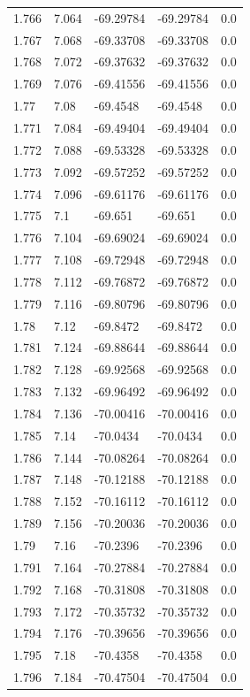 \begin{tabular}{lllll}
1.766 & 7.064 & -69.29784 & -69.29784 & 0.0 \\
1.767 & 7.068 & -69.33708 & -69.33708 & 0.0 \\
1.768 & 7.072 & -69.37632 & -69.37632 & 0.0 \\
1.769 & 7.076 & -69.41556 & -69.41556 & 0.0 \\
1.77 & 7.08 & -69.4548 & -69.4548 & 0.0 \\
1.771 & 7.084 & -69.49404 & -69.49404 & 0.0 \\
1.772 & 7.088 & -69.53328 & -69.53328 & 0.0 \\
1.773 & 7.092 & -69.57252 & -69.57252 & 0.0 \\
1.774 & 7.096 & -69.61176 & -69.61176 & 0.0 \\
1.775 & 7.1 & -69.651 & -69.651 & 0.0 \\
1.776 & 7.104 & -69.69024 & -69.69024 & 0.0 \\
1.777 & 7.108 & -69.72948 & -69.72948 & 0.0 \\
1.778 & 7.112 & -69.76872 & -69.76872 & 0.0 \\
1.779 & 7.116 & -69.80796 & -69.80796 & 0.0 \\
1.78 & 7.12 & -69.8472 & -69.8472 & 0.0 \\
1.781 & 7.124 & -69.88644 & -69.88644 & 0.0 \\
1.782 & 7.128 & -69.92568 & -69.92568 & 0.0 \\
1.783 & 7.132 & -69.96492 & -69.96492 & 0.0 \\
1.784 & 7.136 & -70.00416 & -70.00416 & 0.0 \\
1.785 & 7.14 & -70.0434 & -70.0434 & 0.0 \\
1.786 & 7.144 & -70.08264 & -70.08264 & 0.0 \\
1.787 & 7.148 & -70.12188 & -70.12188 & 0.0 \\
1.788 & 7.152 & -70.16112 & -70.16112 & 0.0 \\
1.789 & 7.156 & -70.20036 & -70.20036 & 0.0 \\
1.79 & 7.16 & -70.2396 & -70.2396 & 0.0 \\
1.791 & 7.164 & -70.27884 & -70.27884 & 0.0 \\
1.792 & 7.168 & -70.31808 & -70.31808 & 0.0 \\
1.793 & 7.172 & -70.35732 & -70.35732 & 0.0 \\
1.794 & 7.176 & -70.39656 & -70.39656 & 0.0 \\
1.795 & 7.18 & -70.4358 & -70.4358 & 0.0 \\
1.796 & 7.184 & -70.47504 & -70.47504 & 0.0 \\

\end{tabular}

